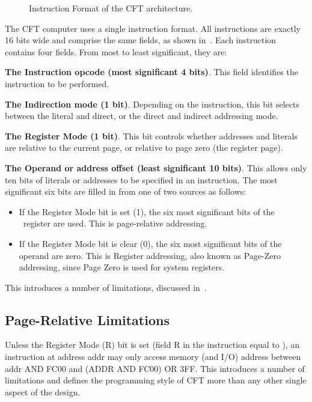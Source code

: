 \begin{figure}[tb]
  \centering
  
  \caption{\label{fig-if}Instruction Format of the CFT architecture.}
\end{figure}

The CFT computer uses a single instruction format. All instructions are exactly
16 bits wide and comprise the same fields, as shown in~. Each
instruction contains four fields. From most to least significant, they are:

\begin{description}
\item{\bfseries The Instruction opcode (most significant 4 bits)}. This
  field identifies the instruction to be performed.
\item{\bfseries The Indirection mode (1 bit)}. Depending on the instruction,
  this bit selects between the literal and direct, or the direct and
  indirect addressing mode.
\item{\bfseries The Register Mode (1 bit)}. This bit controls whether
  addresses and literals are relative to the current page, or relative
  to page zero (the register page).
\item{\bfseries The Operand or address offset (least significant 10
  bits)}. This allows only ten bits of literals or addresses to be
  specified in an instruction. The most significant six bits are
  filled in from one of two sources as follows:
  \begin{itemize}
  \item If the Register Mode bit is set (1), the six most significant bits
    of the \PC\ register are used. This is page-relative addressing.
  \item If the Register Mode bit is clear (0), the six most
    significant bits of the operand are zero. This is Register
    addressing, also known as Page-Zero addressing, since Page Zero is
    used for system registers.
  \end{itemize}
  This introduces a number of limitations, discussed in~.
\end{description}

\subsection{Page-Relative Limitations}
\label{sec-pagerel}

Unless the Register Mode (R) bit is set (field R in the instruction
equal to ), an instruction at address {\ttfamily addr} may only access
memory (and I/O) address between {\ttfamily addr AND FC00} and {\ttfamily (ADDR
  AND FC00) OR 3FF}. This introduces a number of limitations and
defines the programming style of CFT more than any other single aspect
of the design.

